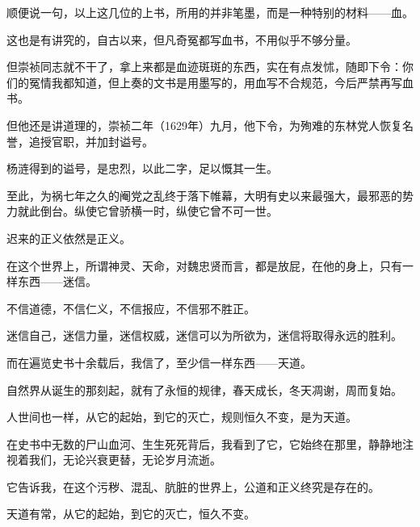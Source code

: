 \begin{multicols}{\theparacolNo}
顺便说一句，以上这几位的上书，所用的并非笔墨，而是一种特别的材料——血。

这也是有讲究的，自古以来，但凡奇冤都写血书，不用似乎不够分量。

但崇祯同志就不干了，拿上来都是血迹斑斑的东西，实在有点发怵，随即下令：你们的冤情我都知道，但上奏的文书是用墨写的，用血写不合规范，今后严禁再写血书。

但他还是讲道理的，崇祯二年（1629年）九月，他下令，为殉难的东林党人恢复名誉，追授官职，并加封谥号。

杨涟得到的谥号，是忠烈，以此二字，足以慨其一生。

至此，为祸七年之久的阉党之乱终于落下帷幕，大明有史以来最强大，最邪恶的势力就此倒台。纵使它曾骄横一时，纵使它曾不可一世。

迟来的正义依然是正义。

在这个世界上，所谓神灵、天命，对魏忠贤而言，都是放屁，在他的身上，只有一样东西——迷信。

不信道德，不信仁义，不信报应，不信邪不胜正。

迷信自己，迷信力量，迷信权威，迷信可以为所欲为，迷信将取得永远的胜利。

而在遍览史书十余载后，我信了，至少信一样东西——天道。

自然界从诞生的那刻起，就有了永恒的规律，春天成长，冬天凋谢，周而复始。

人世间也一样，从它的起始，到它的灭亡，规则恒久不变，是为天道。

在史书中无数的尸山血河、生生死死背后，我看到了它，它始终在那里，静静地注视着我们，无论兴衰更替，无论岁月流逝。

它告诉我，在这个污秽、混乱、肮脏的世界上，公道和正义终究是存在的。

天道有常，从它的起始，到它的灭亡，恒久不变。
\ifnum{}
	\end{multicols}
\fi
\newpage
